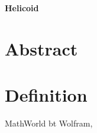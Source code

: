 \documentclass[12pt,dvipdfmx]{article}
\begin{document}
\begin{center}

{\bf \Large Helicoid}

\end{center}


\section{Abstract}


\section{Definition}



\begin{thebibliography}{9}

 MathWorld bt Wolfram, \verb||


\end{thebibliography}
\end{document}
